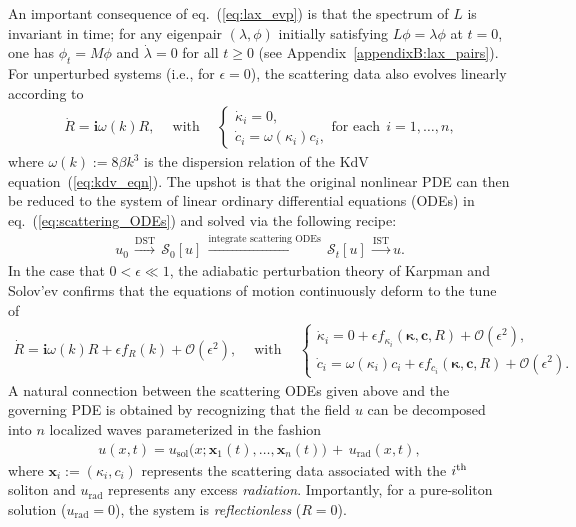 \documentclass[journal=gmj]{CUP-JNL-DTM}%
\theoremstyle{definition}
\numberwithin{equation}{section}
\begin{document}
\smallskip

An important consequence of eq.~(\ref{eq:lax_evp}) is that the spectrum of $L$ is invariant in time; for any eigenpair $(\lambda, \phi)$ initially satisfying $L\phi = \lambda\phi$ at $t=0$, one has $\phi_t = M\phi$ and $\dot{\lambda} = 0$ for all $t \geq 0$ (see Appendix~\ref{appendixB:lax_pairs}).\\ For unperturbed systems (i.e., for $\epsilon = 0$), the scattering data also evolves linearly according to \begin{align}\label{eq:scattering_ODEs}
    \dot{R} = \boldsymbol{i}\omega(k)R,
    \quad \ \text{with} \ \quad
    \begin{cases}
        \dot{\kappa}_i = 0,
        \\
        \dot{c}_i = \omega(\kappa_i) c_i,
    \end{cases}
    \text{for each} \ \ i=1,\dots,n,
\end{align} where $\omega(k) := 8\beta k^3$ is the dispersion relation of the KdV equation~(\ref{eq:kdv_eqn}). The upshot is that the original nonlinear PDE can then be reduced to the system of linear ordinary differential equations (ODEs) in eq.~(\ref{eq:scattering_ODEs}) and solved via the following recipe: \begin{align*}
    u_0
    \, \xrightarrow{\text{DST}} \, \mathcal S_0[u]
    \, \xrightarrow{\text{integrate scattering ODEs}} \, \mathcal{S}_t[u]
    \, \xrightarrow{\text{IST}} u.
\end{align*} In the case that $0 < \epsilon \ll 1$, the adiabatic perturbation theory of Karpman and Solov’ev \cite{Karpman.Solovev1981PhysicaDNonlinearPhenomena} confirms that the equations of motion continuously deform to the tune of \begin{align}\label{eq:scattering_ODEs_perturbed}
    \dot{R} = \boldsymbol{i}\omega(k)R + \epsilon f_R(k) + \mathcal{O}(\epsilon^2),
    \quad \ \text{with} \ \quad
    \begin{cases}
        \dot{\kappa}_i = 0 + \epsilon f_{\kappa_i}(\boldsymbol{\kappa}, \mathbf{c}, R) + \mathcal{O}(\epsilon^2),
        \\
        \dot{c}_i = \omega(\kappa_i) c_i + \epsilon f_{c_i}(\boldsymbol{\kappa}, \mathbf{c}, R) + \mathcal{O}(\epsilon^2).
    \end{cases}
\end{align} A natural connection between the scattering ODEs given above and the governing PDE is obtained by recognizing that the field $u$ can be decomposed into $n$ localized waves parameterized in the fashion \begin{align}\label{eq:soliton_ansatz}
    u(x,t) = u_{\text{sol}}\big(x; \mathbf{x}_1(t), \dots, \mathbf{x}_n(t)\big) \, + \, u_{\text{rad}}(x,t),
\end{align} where $\mathbf{x}_i := (\kappa_i, c_i)$ represents the scattering data associated with the $i^{\rm{th}}$ soliton and $u_{\text{rad}}$ represents any excess \textit{radiation}. Importantly, for a pure-soliton solution ($u_{\text{rad}} = 0$), the system is \textit{reflectionless} ($R = 0$).
\end{document}
